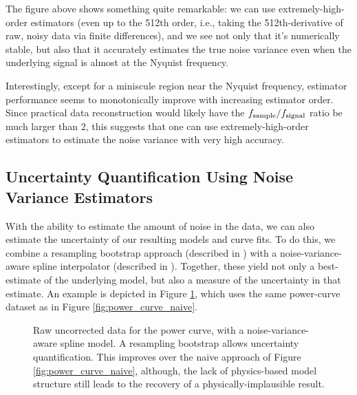 The figure above shows something quite remarkable: we can use extremely-high-order estimators (even up to the 512th order, i.e., taking the 512th-derivative of raw, noisy data via finite differences), and we see not only that it's numerically stable, but also that it accurately estimates the true noise variance even when the underlying signal is almost at the Nyquist frequency.

Interestingly, except for a miniscule region near the Nyquist frequency, estimator performance seems to monotonically improve with increasing estimator order. Since practical data reconstruction would likely have the $f_{\rm sample} / f_{\rm signal}$ ratio be much larger than 2, this suggests that one can use extremely-high-order estimators to estimate the noise variance with very high accuracy.

\subsection{Uncertainty Quantification Using Noise Variance Estimators}

With the ability to estimate the amount of noise in the data, we can also estimate the uncertainty of our resulting models and curve fits. To do this, we combine a resampling bootstrap approach (described in \cite{surrogates, elements_of_statistical_learning}) with a noise-variance-aware spline interpolator (described in \cite{surrogates, wahba}). Together, these yield not only a best-estimate of the underlying model, but also a measure of the uncertainty in that estimate. An example is depicted in Figure \ref{fig:power_curve_spline_but_no_physics}, which uses the same power-curve dataset as in Figure \ref{fig:power_curve_naive}.

\begin{figure}[!htb]
    \centering
    \caption{Raw uncorrected data for the power curve, with a noise-variance-aware spline model. A resampling bootstrap allows uncertainty quantification. This improves over the naive approach of Figure \ref{fig:power_curve_naive}, although, the lack of physics-based model structure still leads to the recovery of a physically-implausible result.}
    \label{fig:power_curve_spline_but_no_physics}
\end{figure}

